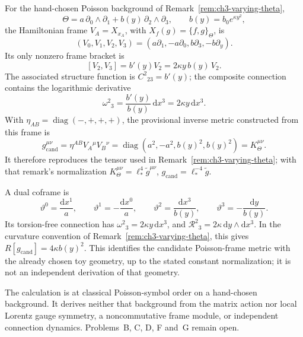 For the hand-chosen Poisson background of
Remark~\ref{rem:ch3-varying-theta},
\[
  \Theta=a\,\partial_0\wedge\partial_1
         +b(y)\,\partial_2\wedge\partial_3,
  \qquad b(y)=b_0e^{\kappa y^2},
\]
the Hamiltonian frame \(V_A=X_{x_A}\), with
\(X_f(g)=\{f,g\}_\Theta\), is
\[
  (V_0,V_1,V_2,V_3)
  =(a\partial_1,-a\partial_0,b\partial_3,-b\partial_y).
\]
Its only nonzero frame bracket is
\[
  [V_2,V_3]=b'(y)V_2=2\kappa y\,b(y)\,V_2.
\]
The associated structure function is \(C^2{}_{23}=b'(y)\);
the composite connection contains the logarithmic derivative
\[
  \omega^2{}_3=\frac{b'(y)}{b(y)}\,\mathrm{d}x^3
  =2\kappa y\,\mathrm{d}x^3.
\]
With \(\eta_{AB}=\operatorname{diag}(-,+,+,+)\), the provisional
inverse metric constructed from this frame is
\[
  g_{\mathrm{cand}}^{\mu\nu}
  =\eta^{AB}V_A{}^\mu V_B{}^\nu
  =\operatorname{diag}(a^2,-a^2,b(y)^2,b(y)^2)
  =K_\Theta^{\mu\nu}.
\]
It therefore reproduces the tensor used in
Remark~\ref{rem:ch3-varying-theta}; with that remark's
normalization \(K_\Theta^{\mu\nu}=\ell_*^4\tilde g^{\mu\nu}\),
\(g_{\mathrm{cand}}=\ell_*^{-4}\tilde g\).

A dual coframe is
\[
  \vartheta^0=\frac{\mathrm{d}x^1}{a},\qquad
  \vartheta^1=-\frac{\mathrm{d}x^0}{a},\qquad
  \vartheta^2=\frac{\mathrm{d}x^3}{b(y)},\qquad
  \vartheta^3=-\frac{\mathrm{d}y}{b(y)}.
\]
Its torsion-free connection has
\(\omega^2{}_3=2\kappa y\,\mathrm{d}x^3\), and
\(\mathcal R^2{}_3=2\kappa\,\mathrm{d}y\wedge\mathrm{d}x^3\).
In the curvature convention of
Remark~\ref{rem:ch3-varying-theta}, this gives
\(R[g_{\mathrm{cand}}]=4\kappa b(y)^2\).
This identifies the candidate Poisson-frame metric with the
already chosen toy geometry, up to the stated constant
normalization; it is not an independent derivation of that
geometry.

The calculation is at classical Poisson-symbol order on a
hand-chosen background. It derives neither that background from
the matrix action nor local Lorentz gauge symmetry, a
noncommutative frame module, or independent connection dynamics.
Problems~B, C, D, F and~G remain open.

